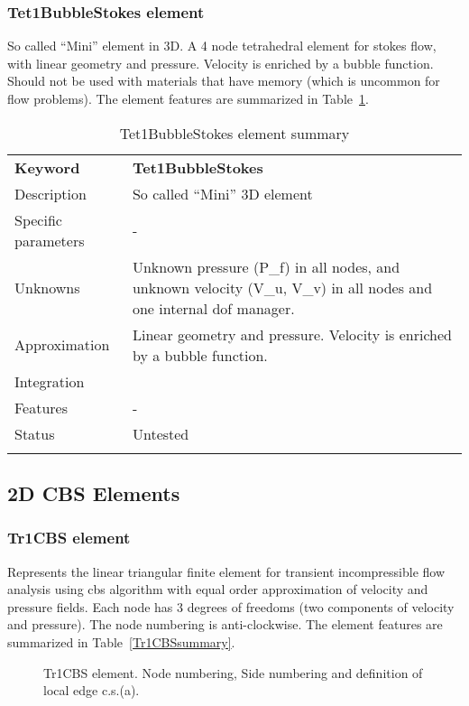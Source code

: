\documentclass[a4paper]{article}
\newcommand{\param}[1]{\texttt{#1}} %
\newcommand{\templabel}{}%
\newcommand{\tempcaption}{}%
\newcounter{nelpar}
\newenvironment{elementsummary}[5]{%
  \gdef\tempcaption{#4}%
  \gdef\templabel{#5}%
  \setcounter{nelpar}{0}%
  \begin{center} %
    \begin{table}[!htb] %
      \begin{tabular}{|l|p{9cm}|}\hline %
        {\bf Keyword} & \bf{#1}\\ %
        {Description} & {#2}\\ %
        {Specific parameters} & {#3}\\ \hline %
}{
  \\ \hline %
      \end{tabular}%
      \caption{\tempcaption}%
      \label{\templabel}%
    \end{table}%
  \end{center}%
}
\newcommand{\elementParam}[1]{%
  \ifthenelse{\value{nelpar}>0} %
             {&{#1}}%
             {\setcounter{nelpar}{1}Parameters&{#1}}%
             \\%
}
\newcommand{\elementDescription}[2]{{#1} & {#2}\\ }
\begin{document}
\subsubsection{Tet1BubbleStokes element}
So called ``Mini'' element in 3D. A 4 node tetrahedral element for stokes flow, with linear geometry and pressure. Velocity is enriched by a bubble function.
Should not be used with materials that have memory (which is uncommon for flow problems). The element features are summarized in Table~\ref{Tet1BubbleStokessummary}.

\begin{elementsummary}{Tet1BubbleStokes}{So called ``Mini'' 3D element}{-}{Tet1BubbleStokes element summary}{Tet1BubbleStokessummary}
\elementDescription{Unknowns}{Unknown pressure (P\_f) in all nodes, and unknown velocity (V\_u, V\_v) in all nodes and one internal dof manager.}
\elementDescription{Approximation}{Linear geometry and pressure. Velocity is enriched by a bubble function.}
\elementDescription{Integration}{}
\elementDescription{Features}{-}
\elementDescription{Status}{Untested}
\end{elementsummary}

\clearpage
\subsection{2D CBS Elements}
\subsubsection{Tr1CBS element}
\label{Tr1CBS}
Represents the linear triangular finite element for transient
incompressible flow analysis using cbs algorithm with equal order
approximation of velocity and pressure fields. Each node has 3 degrees
of freedoms (two components of velocity and pressure).
The node numbering is anti-clockwise. The element features are summarized in Table~\ref{Tr1CBSsummary}.

\begin{figure}[htb]
 \centering
 \begin{makeimage}
  
 \end{makeimage}
 \caption{Tr1CBS element. Node numbering, Side numbering and
 definition of local edge c.s.(a).}
 \label{Tr1CBSfig}
\end{figure}
\end{document}

